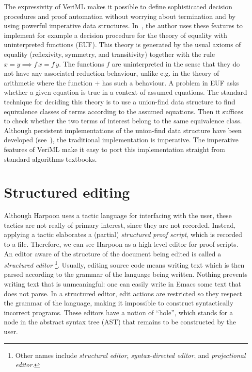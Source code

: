 The expressivity of VeriML makes it possible to define sophisticated decision
procedures and proof automation without worrying about termination and by using
powerful imperative data structures.
In~\cite{Stampoulis:ICFP10}, the author uses these features to implement for
example a decision procedure for the theory of equality with uninterpreted
functions (EUF).
This theory is generated by the usual axioms of equality
(reflexivity, symmetry, and transitivity) together with the rule
$x = y \implies f\, x = f\, y$.
The functions $f$ are uninterpreted in the sense that they do not have any
associated reduction behaviour, unlike e.g. in the theory of arithmetic where
the function $+$ has such a behaviour.
A problem in EUF asks whether a given equation is true in a context of assumed
equations.
The standard technique for deciding this theory is to use a union-find data
structure to find equivalence classes of terms according to the assumed
equations.
Then it suffices to check whether the two terms of interest belong to the same
equivalence class.
Although persistent implementations of the union-find data structure have been
developed (see~\cite{union-find}), the traditional implementation is
imperative.
The imperative features of VeriML make it easy to port this implementation
straight from standard algorithms textbooks.

\section{Structured editing}
\label{sec:structured-editing}

Although Harpoon uses a tactic language for interfacing with the user, these
tactics are not really of primary interest, since they are not
recorded.
Instead, applying a tactic elaborates a (partial)
\emph{structured proof script}, which is recorded to a file.
Therefore, we can see Harpoon as a high-level editor for proof scripts.
An editor aware of the structure of the document being edited is called a
\emph{structured editor}%
\footnote{%
  Other names include \emph{structural editor}, \emph{syntax-directed editor},
  and \emph{projectional editor}.%
}.
Usually, editing source code means writing text which is then parsed according
to the grammar of the language being written.
Nothing prevents writing text that is unmeaningful: one can easily write in
Emacs some text that does not parse.
In a structured editor, edit actions are restricted so they respect the grammar
of the language, making it impossible to construct syntactically incorrect
programs.
These editors have a notion of ``hole'', which stands for a node in the abstract
syntax tree (AST) that remains to be constructed by the user.

